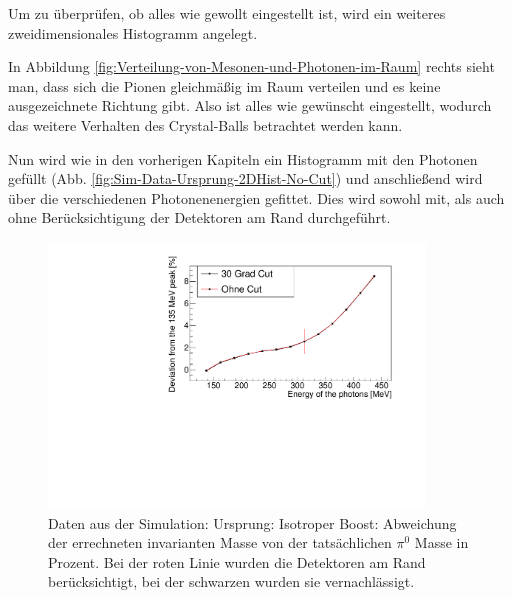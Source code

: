 \documentclass[a4paper,11pt,oneside,final,german,openbib,pdftex]{scrbook}
\begin{document}
{%

Um zu überprüfen, ob alles wie gewollt eingestellt ist, wird ein weiteres zweidimensionales Histogramm angelegt.



In Abbildung \ref{fig:Verteilung-von-Mesonen-und-Photonen-im-Raum} rechts sieht man, dass sich die Pionen gleichm\"a{\ss}ig im Raum verteilen und es keine ausgezeichnete Richtung gibt. Also ist alles wie gew\"unscht eingestellt, wodurch das weitere Verhalten des Crystal-Balls betrachtet werden kann.

Nun wird wie in den vorherigen Kapiteln ein Histogramm mit den Photonen gefüllt (Abb. \ref{fig:Sim-Data-Ursprung-2DHist-No-Cut}) und anschließend wird über die verschiedenen Photonenenergien gefittet. Dies wird sowohl mit, als auch ohne Berücksichtigung der Detektoren am Rand durchgeführt.

\begin{figure}[h!]
	\begin{center}
		\includegraphics[width=100mm]{20172804IsotropUrpsprungDeviation}
	\end{center}
\caption[Simulation: Isotroper Zerfall Abweichung mit und ohne Detektoren am Rand]{Daten aus der Simulation: Ursprung: Isotroper Boost: Abweichung der errechneten invarianten Masse von der tatsächlichen $\pi^0$ Masse in Prozent. Bei der roten Linie wurden die Detektoren am Rand berücksichtigt, bei der schwarzen wurden sie vernachlässigt.}
\label{fig:Pi0-Ursprung-Relative-Abweichung}
\end{figure}



}
\end{document}
